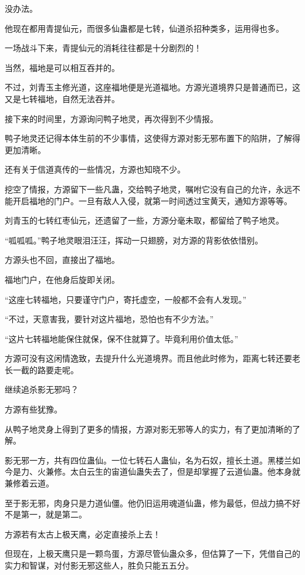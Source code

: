 \begin{this_body}
没办法。

他现在都用青提仙元，而很多仙蛊都是七转，仙道杀招种类多，运用得也多。

一场战斗下来，青提仙元的消耗往往都是十分剧烈的！

当然，福地是可以相互吞并的。

不过，刘青玉主修光道，这座福地便是光道福地。方源光道境界只是普通而已，这又是七转福地，自然无法吞并。

接下来的时间里，方源询问鸭子地灵，再次得到不少情报。

鸭子地灵还记得本体生前的不少事情，这使得方源对影无邪布置下的陷阱，了解得更加清晰。

还有关于信道真传的一些情况，方源也知晓不少。

挖空了情报，方源留下一些凡蛊，交给鸭子地灵，嘱咐它没有自己的允许，永远不能开启福地的门户。一旦有敌人入侵，就第一时间透过宝黄天，通知方源等等。

刘青玉的七转红枣仙元，还遗留了一些，方源分毫未取，都留给了鸭子地灵。

“呱呱呱。”鸭子地灵眼泪汪汪，挥动一只翅膀，对方源的背影依依惜别。

方源头也不回，直接出了福地。

福地门户，在他身后旋即关闭。

“这座七转福地，只要谨守门户，寄托虚空，一般都不会有人发现。”

“不过，天意害我，要针对这片福地，恐怕也有不少方法。”

“这片七转福地能保住就保，保不住就算了。毕竟利用价值太低。”

方源可没有这闲情逸致，去提升什么光道境界。而且他此时修为，距离七转还要老长一截的路要走呢。

继续追杀影无邪吗？

方源有些犹豫。

从鸭子地灵身上得到了更多的情报，方源对影无邪等人的实力，有了更加清晰的了解。

影无邪一方，共有四位蛊仙。一位七转石人蛊仙，名为石奴，擅长土道。黑楼兰如今是力、火兼修。太白云生的宙道仙蛊失去了，但是却掌握了云道仙蛊。他本身就兼修着云道。

至于影无邪，肉身只是力道仙僵。他仍旧运用魂道仙蛊，修为最低，但战力搞不好不是第一，就是第二。

方源若有太古上极天鹰，必定直接杀上去！

但现在，上极天鹰只是一颗鸟蛋，方源尽管仙蛊众多，但估算了一下，凭借自己的实力和智谋，对付影无邪这些人，胜负只能五五分。


\end{this_body}
